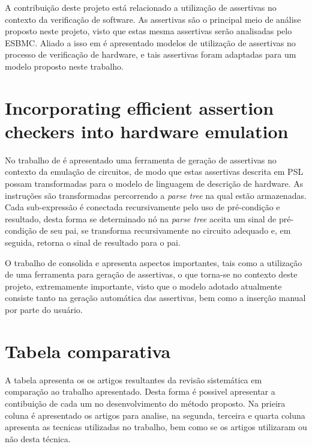 \par
A contribuição deste projeto está relacionado a utilização de assertivas no contexto da verificação de software. As assertivas são o principal meio de análise proposto neste projeto, visto que estas mesma assertivas serão analisadas pelo ESBMC. Aliado a isso em  é apresentado modelos de utilização de assertivas no processo de verificação de hardware, e tais assertivas foram adaptadas para um modelo proposto neste trabalho.

\section{Incorporating efficient assertion checkers into hardware emulation}
\par
No trabalho de  é apresentado uma ferramenta de geração de assertivas no contexto da emulação de circuitos, de modo que estas assertivas descrita em PSL possam transformadas para o modelo de linguagem de descrição de hardware. As instruções são transformadas percorrendo a \textit{parse tree} na qual estão armazenadas. Cada sub-expressão é conectada recursivamente pelo uso de pré-condição e resultado, desta forma se determinado nó na \textit{parse tree} aceita um sinal de pré-condição de seu pai, se transforma recursivamente no circuito adequado e, em seguida, retorna o sinal de resultado para o pai.

\par
O trabalho de  consolida e apresenta aspectos importantes, tais como a utilização de uma ferramenta para geração de assertivas, o que torna-se no contexto deste projeto, extremamente importante, visto que o modelo adotado atualmente consiste tanto na geração automática das assertivas, bem como a inserção manual por parte do usuário.

\section{Tabela comparativa}
\par
A tabela apresenta os os artigos resultantes da revisão sistemática em comparação ao trabalho apresentado. Desta forma é possivel apresentar a contibuição de cada um no desenvolvimento do método proposto. Na prieira coluna é apresentado os artigos para analise, na segunda, terceira e quarta coluna apresenta as tecnicas utilizadas no trabalho, bem como se os artigos utilizaram ou não desta técnica.

